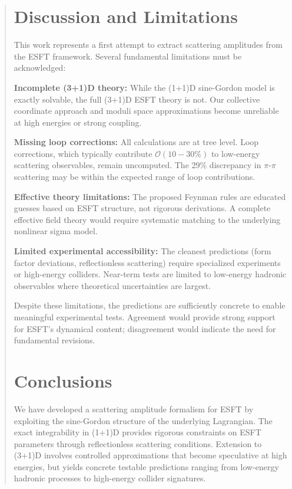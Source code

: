 ﻿\documentclass[twocolumn,prd,amsmath,amssymb,aps]{revtex4-2}
\begin{document}
\begin{abstract}
\section{Discussion and Limitations}

This work represents a first attempt to extract scattering amplitudes from the ESFT framework. Several fundamental limitations must be acknowledged:

\textbf{Incomplete (3+1)D theory:} While the (1+1)D sine-Gordon model is exactly solvable, the full (3+1)D ESFT theory is not. Our collective coordinate approach and moduli space approximations become unreliable at high energies or strong coupling.

\textbf{Missing loop corrections:} All calculations are at tree level. Loop corrections, which typically contribute $\mathcal{O}(10-30\%)$ to low-energy scattering observables, remain uncomputed. The 29\% discrepancy in $\pi$-$\pi$ scattering may be within the expected range of loop contributions.

\textbf{Effective theory limitations:} The proposed Feynman rules are educated guesses based on ESFT structure, not rigorous derivations. A complete effective field theory would require systematic matching to the underlying nonlinear sigma model.

\textbf{Limited experimental accessibility:} The cleanest predictions (form factor deviations, reflectionless scattering) require specialized experiments or high-energy colliders. Near-term tests are limited to low-energy hadronic observables where theoretical uncertainties are largest.

Despite these limitations, the predictions are sufficiently concrete to enable meaningful experimental tests. Agreement would provide strong support for ESFT's dynamical content; disagreement would indicate the need for fundamental revisions.

\section{Conclusions}

We have developed a scattering amplitude formalism for ESFT by exploiting the sine-Gordon structure of the underlying Lagrangian. The exact integrability in (1+1)D provides rigorous constraints on ESFT parameters through reflectionless scattering conditions. Extension to (3+1)D involves controlled approximations that become speculative at high energies, but yields concrete testable predictions ranging from low-energy hadronic processes to high-energy collider signatures.


\end{abstract}
\end{document}
